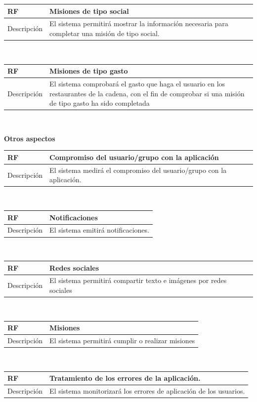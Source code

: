 \documentclass[twoside]{report}
\newcommand\addrow[2]{#1 &#2\\ }
\newcommand\addheading[2]{#1 &#2\\ \hline}
\newcommand\tabularhead{\begin{tabular}{lp{0.7\textwidth}}
\hline
}
\newenvironment{req}{\tabularhead}
{\hline\end{tabular}}
\begin{document}
\begin{req}
	\addheading{\textbf{RF\arabic{functionalRequirements}}}{Misiones de tipo social}
	\addrow{Descripción}{El sistema permitirá mostrar la información necesaria para completar una misión de tipo social.}
\end{req}\\

\begin{req}
	\addheading{\textbf{RF\arabic{functionalRequirements}}}{Misiones de tipo gasto}
	\addrow{Descripción}{El sistema comprobará el gasto que haga el usuario en los restaurantes de la cadena, con el fin de comprobar si una misión de tipo gasto ha sido completada}
\end{req}\\

\textbf{Otros aspectos}\\

\begin{req}
	\label{rfcompromiso}
	\addheading{\textbf{RF\arabic{functionalRequirements}}}{Compromiso del usuario/grupo con la aplicación}
	\addrow{Descripción}{El sistema medirá el compromiso del usuario/grupo con la aplicación.}
\end{req}\\

\begin{req}
	\addheading{\textbf{RF\arabic{functionalRequirements}}}{Notificaciones}
	\addrow{Descripción}{El sistema emitirá notificaciones.}
\end{req}\\

\begin{req}
	\addheading{\textbf{RF\arabic{functionalRequirements}}}{Redes sociales}
	\addrow{Descripción}{El sistema permitirá compartir texto e imágenes por redes sociales}
\end{req}\\

\begin{req}
	\addheading{\textbf{RF\arabic{functionalRequirements}}}{Misiones}
	\addrow{Descripción}{El sistema permitirá cumplir o realizar misiones}
\end{req}\\

\begin{req}
	\addheading{\textbf{RF\arabic{functionalRequirements}}}{Tratamiento de los errores de la aplicación.}
	\addrow{Descripción}{El sistema monitorizará los errores de aplicación de los usuarios.}
\end{req}\\
\end{document}
